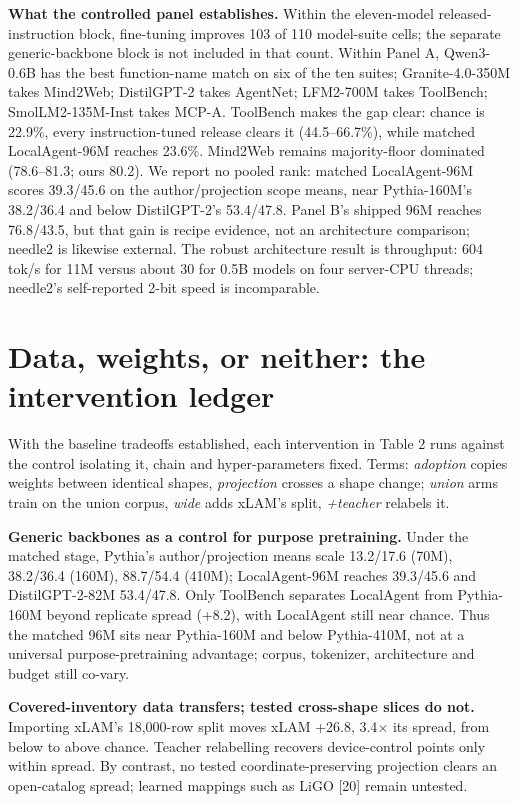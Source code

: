 \documentclass{article}
\begin{document}
\textbf{What the controlled panel establishes.} Within the eleven-model released-instruction block,
fine-tuning improves 103 of 110 model-suite cells; the separate generic-backbone block is
not included in that count. Within Panel A, Qwen3-0.6B has the best function-name match on six of the ten suites; Granite-4.0-350M takes Mind2Web; DistilGPT-2 takes AgentNet; LFM2-700M takes ToolBench; SmolLM2-135M-Inst takes MCP-A. ToolBench makes the gap clear: chance is 22.9\%, every instruction-tuned release clears it (44.5--66.7\%), while matched LocalAgent-96M reaches 23.6\%. Mind2Web remains majority-floor dominated (78.6--81.3; ours 80.2). We report no pooled rank: matched LocalAgent-96M scores 39.3/45.6 on the author/projection scope means, near Pythia-160M's 38.2/36.4 and below DistilGPT-2's 53.4/47.8. Panel B's shipped 96M reaches 76.8/43.5, but that gain is recipe evidence, not an architecture comparison; needle2 is likewise external. The robust architecture result is throughput: 604 tok/s for 11M versus about 30 for 0.5B models on four server-CPU threads; needle2's self-reported 2-bit speed is incomparable.


\section{Data, weights, or neither: the intervention ledger}

With the baseline tradeoffs established, each intervention in Table 2 runs against the control isolating it, chain and hyper-parameters fixed. Terms: \emph{adoption} copies weights between identical shapes, \emph{projection} crosses a shape change; \emph{union} arms train on the union corpus, \emph{wide} adds xLAM's split, \emph{+teacher} relabels it.


\textbf{Generic backbones as a control for purpose pretraining.} Under the matched stage, Pythia's
author/projection means scale 13.2/17.6 (70M),
38.2/36.4 (160M), 88.7/54.4 (410M);
LocalAgent-96M reaches 39.3/45.6 and DistilGPT-2-82M
53.4/47.8. Only ToolBench separates LocalAgent from Pythia-160M
beyond replicate spread (+8.2), with LocalAgent still near chance. Thus the matched 96M
sits near Pythia-160M and below Pythia-410M, not at a universal purpose-pretraining advantage;
corpus, tokenizer, architecture and budget still co-vary.


\textbf{Covered-inventory data transfers; tested cross-shape slices do not.} Importing xLAM's
18,000-row split moves xLAM +26.8, 3.4$\times$ its spread, from below to above chance. Teacher
relabelling recovers device-control points only within spread. By contrast, no tested
coordinate-preserving projection clears an open-catalog spread; learned mappings such as LiGO
[20] remain untested.
\end{document}
